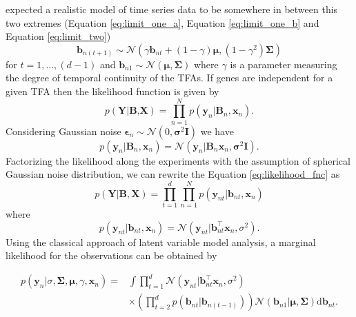 \cite{Sanguinetti:2006} expected a realistic model of time series data to be somewhere in between this two extremes (Equation \ref{eq:limit_one_a}, Equation \ref{eq:limit_one_b} and Equation \ref{eq:limit_two})
\begin{equation} \label{eq:tfa_SanG_update}
  \textbf{b}_{n(t+1)} \sim \mathcal{N} (\gamma \textbf{b}_{nt} + (1-\gamma)\boldsymbol{\mu},(1-\gamma^2)\boldsymbol{\Sigma})
\end{equation}
for $ t= 1, ... , (d-1)$ and $ \textbf{b}_{n1} \sim \mathcal{N} ( \boldsymbol{\mu},\boldsymbol{\Sigma})$
where $\gamma$ is a parameter measuring the degree of temporal continuity of the TFAs. If genes are independent for a given TFA then the likelihood function is given by
\begin{equation} \label{eq:likelihood_fnc}
  p\left(\textbf{Y}|\textbf{B,X}\right)= \prod_{n \mathop = 1}^{N} p\left(\textbf{y}_n|\textbf{B}_n,\textbf{x}_n\right).
\end{equation}
Considering Gaussian noise $\boldsymbol{\epsilon}_n \sim \mathcal{N} \left(0,\boldsymbol{\sigma}^2\textbf{I}\right)$ we have
\begin{equation} \label{eq:likelihood_fnc_SingleGene}
  p\left(\textbf{y}_n|\textbf{B}_n,\textbf{x}_n\right)= \mathcal{N} \left(\textbf{y}_n|\textbf{B}_n \textbf{x}_n, \boldsymbol{\sigma}^2\textbf{I} \right).
\end{equation}
Factorizing the likelihood along the experiments with the assumption of spherical Gaussian noise distribution, we can rewrite the Equation \ref{eq:likelihood_fnc} as
\begin{equation} \label{eq:likelihood_factorize}
  p\left(\textbf{Y}|\textbf{B},\textbf{X}\right)= 
     \prod_{t \mathop = 1}^{d} \prod_{n \mathop = 1}^{N} p\left(\textbf{y}_{nt}|\textbf{b}_{nt},\textbf{x}_n\right)
\end{equation}
where
\begin{equation} \label{eq:likelihood_fnc_allGene}
  p\left(\textbf{y}_{nt}|\textbf{b}_{nt},\textbf{x}_n\right)= \mathcal{N} \left(\textbf{y}_{nt}|\textbf{b}^\top_{nt}\textbf{x}_n,\sigma^2 \right).
\end{equation}
Using the classical approach of latent variable model analysis, a marginal likelihood for the observations can be obtained by

\begin{equation} \label{eq:marginal_likelihood_tfa}
\begin{aligned}
p\left(\textbf{y}_n|\sigma,\boldsymbol{\Sigma},\boldsymbol{\mu},\gamma,\textbf{x}_n\right) = &
\int \prod^{d}_{t=1} \mathcal{N} \left(\textbf{y}_{nt}|\textbf{b}^\top_{nt}\textbf{x}_n, \sigma^2 \right)\\
& \times \left( \prod^{d}_{t=2} p\left(\textbf{b}_{nt}|\textbf{b}_{n(t-1)}\right) \right)
\mathcal{N} \left(\textbf{b}_{n1}|\boldsymbol{\mu},\boldsymbol{\Sigma} \right)\text{d}\textbf{b}_{nt}.
\end{aligned}
\end{equation}

